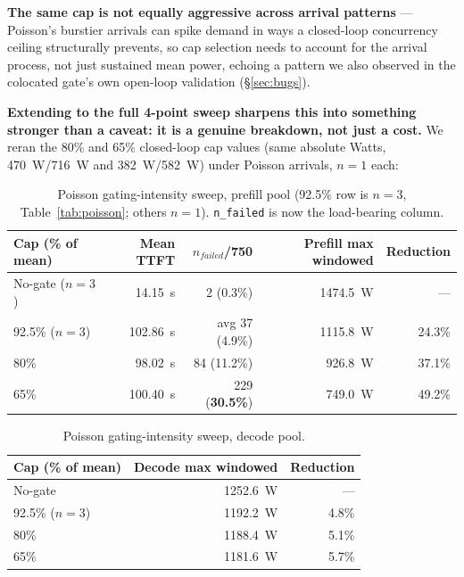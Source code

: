 \documentclass[sigconf,review,anonymous]{acmart}
\begin{document}
\textbf{The same cap is not equally aggressive across arrival patterns} --- Poisson's
burstier arrivals can spike demand in ways a closed-loop concurrency ceiling structurally
prevents, so cap selection needs to account for the arrival process, not just sustained mean
power, echoing a pattern we also observed in the colocated gate's own open-loop validation
(\S\ref{sec:bugs}).

\textbf{Extending to the full 4-point sweep sharpens this into something stronger than a
caveat: it is a genuine breakdown, not just a cost.} We reran the 80\% and 65\% closed-loop
cap values (same absolute Watts, 470~W/716~W and 382~W/582~W) under Poisson arrivals,
$n{=}1$ each:

\begin{table}[t]
  \caption{Poisson gating-intensity sweep, prefill pool (92.5\% row is $n{=}3$,
    Table~\ref{tab:poisson}; others $n{=}1$). \texttt{n\_failed} is now the load-bearing
    column.}
  \label{tab:poisson-sweep}
  \footnotesize
  \begin{tabular}{@{}lrrrr@{}}
    \toprule
    Cap (\% of mean) & Mean TTFT & $n_\mathit{failed}$/750 & Prefill max windowed & Reduction \\
    \midrule
    No-gate ($n{=}3$) & 14.15~s  & 2 (0.3\%)          & 1474.5~W & --- \\
    92.5\% ($n{=}3$)  & 102.86~s & avg 37 (4.9\%)      & 1115.8~W & 24.3\% \\
    80\%              & 98.02~s  & 84 (11.2\%)         & 926.8~W  & 37.1\% \\
    65\%              & 100.40~s & 229 (\textbf{30.5\%}) & 749.0~W  & 49.2\% \\
    \bottomrule
  \end{tabular}
\end{table}

\begin{table}[t]
  \caption{Poisson gating-intensity sweep, decode pool.}
  \label{tab:poisson-sweep-decode}
  \footnotesize
  \begin{tabular}{@{}lrr@{}}
    \toprule
    Cap (\% of mean) & Decode max windowed & Reduction \\
    \midrule
    No-gate          & 1252.6~W & --- \\
    92.5\% ($n{=}3$) & 1192.2~W & 4.8\% \\
    80\%             & 1188.4~W & 5.1\% \\
    65\%             & 1181.6~W & 5.7\% \\
    \bottomrule
  \end{tabular}
\end{table}
\end{document}
